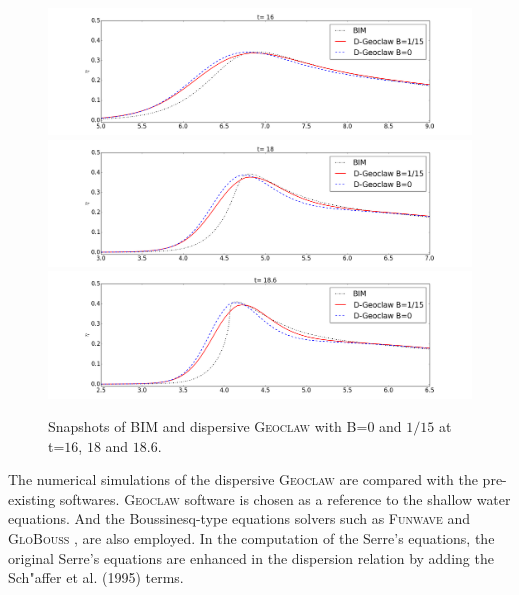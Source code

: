 \documentclass[review]{elsarticle}
\begin{document}
\begin{figure}[!htb]
\centering
\includegraphics[width=.9\textwidth]{_fig/bim_dgeo_160.png}\\
\includegraphics[width=.9\textwidth]{_fig/bim_dgeo_180.png}\\
\includegraphics[width=.9\textwidth]{_fig/bim_dgeo_186.png}
\caption{Snapshots of BIM and dispersive \textsc{Geoclaw} with B=$0$ and $1/15$ at t=$16$, $18$ and $18.6$.}
\label{fig:bim_dgeo}
\end{figure}

The numerical simulations of 
the dispersive \textsc{Geoclaw} are compared
with the pre-existing softwares. 
\textsc{Geoclaw} software \cite{clawpack} is chosen
as a reference to the shallow water equations.
And the Boussinesq-type equations solvers
such as \textsc{Funwave} \cite{shi2012high}
and \textsc{GloBouss} \cite{lovholt2010coupling}, are also employed. 
In the computation of the Serre's equations, 
the original Serre's equations are enhanced in the dispersion relation
by adding the Sch{"a}ffer et al. (1995) \cite{schaffer1995further} terms. 
\end{document}
